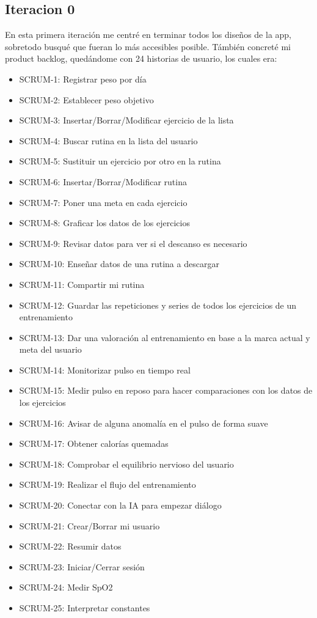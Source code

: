 \subsection{Iteracion 0}
En esta primera iteración me centré en terminar todos los diseños de la app, sobretodo busqué que fueran lo más accesibles posible. Támbién concreté mi product backlog, quedándome con 24 historias de usuario, los cuales era:
\begin{itemize}
    \item SCRUM-1: Registrar peso por día
    \item SCRUM-2: Establecer peso objetivo
    \item SCRUM-3: Insertar/Borrar/Modificar ejercicio de la lista
    \item SCRUM-4: Buscar rutina en la lista del usuario
    \item SCRUM-5: Sustituir un ejercicio por otro en la rutina
    \item SCRUM-6: Insertar/Borrar/Modificar rutina
    \item SCRUM-7: Poner una meta en cada ejercicio
    \item SCRUM-8: Graficar los datos de los ejercicios
    \item SCRUM-9: Revisar datos para ver si el descanso es necesario
    \item SCRUM-10: Enseñar datos de una rutina a descargar
    \item SCRUM-11: Compartir mi rutina
    \item SCRUM-12: Guardar las repeticiones y series de todos los ejercicios de un entrenamiento
    \item SCRUM-13: Dar una valoración al entrenamiento en base a la marca actual y meta del usuario
    \item SCRUM-14: Monitorizar pulso en tiempo real
    \item SCRUM-15: Medir pulso en reposo para hacer comparaciones con los datos de los ejercicios
    \item SCRUM-16: Avisar de alguna anomalía en el pulso de forma suave
    \item SCRUM-17: Obtener calorías quemadas
    \item SCRUM-18: Comprobar el equilibrio nervioso del usuario
    \item SCRUM-19: Realizar el flujo del entrenamiento
    \item SCRUM-20: Conectar con la IA para empezar diálogo
    \item SCRUM-21: Crear/Borrar mi usuario
    \item SCRUM-22: Resumir datos
    \item SCRUM-23: Iniciar/Cerrar sesión
    \item SCRUM-24: Medir SpO2
    \item SCRUM-25: Interpretar constantes
\end{itemize}
